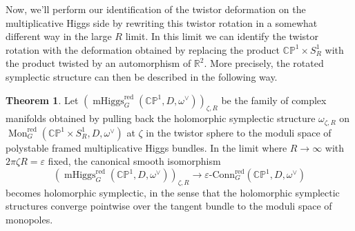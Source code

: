 \documentclass[11pt, oneside, reqno]{amsart}
\theoremstyle{definition} \newtheorem{definition}{Definition}[section]
\newtheorem{theorem}[definition]{Theorem}
\theoremstyle{definition} \newtheorem{remark}[definition]{Remark}
\theoremstyle{definition} \newtheorem{remarks}[definition]{Remarks}
\theoremstyle{definition} \newtheorem{question}[definition]{Question}
\theoremstyle{definition} \newtheorem*{note}{Note}
\theoremstyle{definition} \newtheorem{example}[definition]{Example}
\theoremstyle{definition} \newtheorem{examples}[definition]{Examples}
\newcommand{\bb}[1]{\mathbb{#1}}
\newcommand{\mr}[1]{\mathrm{#1}}
\newcommand{\RR}{\mathbb{R}}
\newcommand{\eps}{\varepsilon}
\DeclareMathOperator{\mhiggs}{mHiggs}
\DeclareMathOperator{\mon}{Mon}
\newcommand{\epsconn}{\varepsilon\text{-Conn}}
\begin{document}
Now, we'll perform our identification of the twistor deformation on the multiplicative Higgs side by rewriting this twistor rotation in a somewhat different way in the large $R$ limit.  In this limit we can identify the twistor rotation with the deformation obtained by replacing the product $\bb{CP}^1 \times S^1_R$ with the product twisted by an automorphism of $\RR^2$.  More precisely, the rotated symplectic structure can then be described in the following way.

\begin{theorem} \label{HK_rotation_thm}
Let $\left(\mhiggs^{\text{red}}_G(\bb{CP}^1,D,\omega^\vee)\right)_{\zeta,R}$ be the family of complex manifolds obtained by pulling back the holomorphic symplectic structure $\omega_{\zeta,R}$ on $\mon_G^{\mr{red}}(\bb{CP}^1 \times S^1_R,D,\omega^\vee)$ at $\zeta$ in the twistor sphere to the moduli space of polystable framed multiplicative Higgs bundles.  In the limit where $R \to \infty$ with $2 \pi \zeta R = \eps$ fixed, the canonical smooth isomorphism
\[\left(\mhiggs^{\text{red}}_G(\bb{CP}^1,D,\omega^\vee)\right)_{\zeta,R} \to \epsconn^{\text{red}}_G(\bb{CP}^1,D,\omega^\vee)\]
becomes holomorphic symplectic, in the sense that the holomorphic symplectic structures converge pointwise over the tangent bundle to the moduli space of monopoles. 
\end{theorem}
\end{document}
